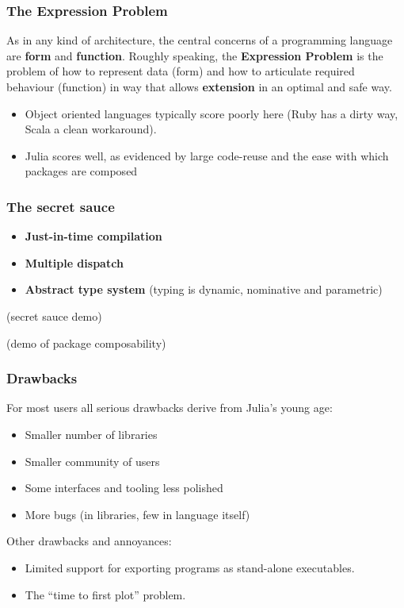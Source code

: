 \documentclass[t]{beamer}
\newcommand\df{\bf\color{Maroon}}
\begin{document}
% 





\begin{frame}
  \frametitle{The Expression Problem}
  As in any kind of architecture, the central concerns of a
  programming language are {\df form} and {\df function}. Roughly
  speaking, the {\df Expression Problem} is the problem of how to
  represent data (form) and how to articulate required behaviour
  (function) in way that allows {\df extension} in an optimal and safe
  way.\pause
  \begin{itemize}
    \item Object oriented languages typically score poorly here (Ruby has a
      dirty way, Scala a clean workaround).
    \item Julia scores well, as evidenced by large code-reuse and
      the ease with which packages are composed 
  \end{itemize}
\end{frame}

\begin{frame}
  \frametitle{The secret sauce}
    \begin{itemize}
    \item {\df Just-in-time compilation}
    \item {\df Multiple dispatch}
    \item {\df Abstract type system} (typing is dynamic, nominative and parametric)
  \end{itemize}
\end{frame}

\begin{frame}
  (secret sauce demo)
\end{frame}

\begin{frame}
  (demo of package composability)
\end{frame}

\begin{frame}
  \frametitle{Drawbacks}
  For most users all serious drawbacks derive from Julia's young age:
  \begin{itemize}
     \item Smaller number of libraries
     \item Smaller community of users
     \item Some interfaces and tooling less polished
     \item More bugs (in libraries, few in language itself)
  \end{itemize}
  Other drawbacks and annoyances:
  \begin{itemize}
     \item Limited support for exporting programs as stand-alone executables.
     \item The ``time to first plot'' problem. 
  \end{itemize}
\end{frame}
\end{document}

